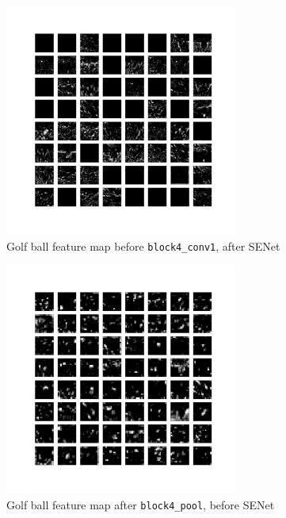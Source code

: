 \documentclass{article}
\begin{document}
\begin{appendices}
\begin{figure}[H]
    \centering
    \includegraphics[width=3in]{csci-8110/hw-3/images/golf-post-SENet-block3_pool-2020-11-05 18_29_46.031795_output.png}
    \caption{Golf ball feature map before \lstinline{block4_conv1}, after SENet}
    \label{fig:golf_3_post}
\end{figure}
\begin{figure}[H]
    \centering
    \includegraphics[width=3in]{csci-8110/hw-3/images/golf-pre-SENet-block4_pool-2020-11-05 18_35_31.491006_output.png}
    \caption{Golf ball feature map after \lstinline{block4_pool}, before SENet}
    \label{fig:golf_4_pre}
\end{figure}


\end{appendices}
\end{document}
